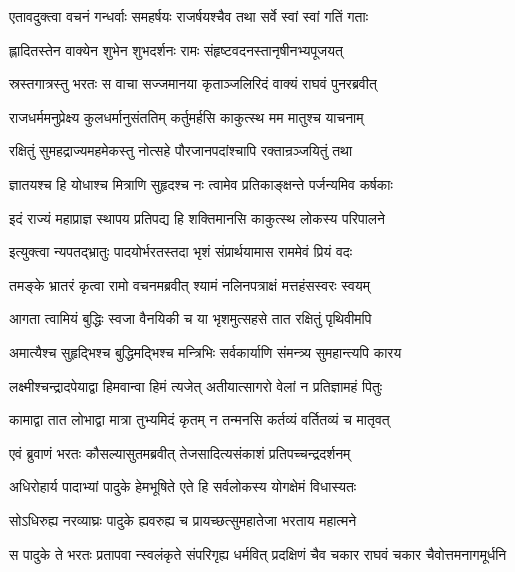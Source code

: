 \twolineshloka
{एतावदुक्त्वा वचनं गन्धर्वाः समहर्षयः}
{राजर्षयश्चैव तथा सर्वे स्वां स्वां गतिं गताः} %

\twolineshloka
{ह्लादितस्तेन वाक्येन शुभेन शुभदर्शनः}
{रामः संहृष्टवदनस्तानृषीनभ्यपूजयत्} %

\twolineshloka
{स्रस्तगात्रस्तु भरतः स वाचा सज्जमानया}
{कृताञ्जलिरिदं वाक्यं राघवं पुनरब्रवीत्} %

\twolineshloka
{राजधर्ममनुप्रेक्ष्य कुलधर्मानुसंततिम्}
{कर्तुमर्हसि काकुत्स्थ मम मातुश्च याचनाम्} %

\twolineshloka
{रक्षितुं सुमहद्राज्यमहमेकस्तु नोत्सहे}
{पौरजानपदांश्चापि रक्तान्रञ्जयितुं तथा} %

\twolineshloka
{ज्ञातयश्च हि योधाश्च मित्राणि सुहृदश्च नः}
{त्वामेव प्रतिकाङ्क्षन्ते पर्जन्यमिव कर्षकाः} %

\twolineshloka
{इदं राज्यं महाप्राज्ञ स्थापय प्रतिपद्य हि}
{शक्तिमानसि काकुत्स्थ लोकस्य परिपालने} %

\twolineshloka
{इत्युक्त्वा न्यपतद्भ्रातुः पादयोर्भरतस्तदा}
{भृशं संप्रार्थयामास राममेवं प्रियं वदः} %

\twolineshloka
{तमङ्के भ्रातरं कृत्वा रामो वचनमब्रवीत्}
{श्यामं नलिनपत्राक्षं मत्तहंसस्वरः स्वयम्} %

\twolineshloka
{आगता त्वामियं बुद्धिः स्वजा वैनयिकी च या}
{भृशमुत्सहसे तात रक्षितुं पृथिवीमपि} %

\twolineshloka
{अमात्यैश्च सुहृद्भिश्च बुद्धिमद्भिश्च मन्त्रिभिः}
{सर्वकार्याणि संमन्त्र्य सुमहान्त्यपि कारय} %

\twolineshloka
{लक्ष्मीश्चन्द्रादपेयाद्वा हिमवान्वा हिमं त्यजेत्}
{अतीयात्सागरो वेलां न प्रतिज्ञामहं पितुः} %

\twolineshloka
{कामाद्वा तात लोभाद्वा मात्रा तुभ्यमिदं कृतम्}
{न तन्मनसि कर्तव्यं वर्तितव्यं च मातृवत्} %

\twolineshloka
{एवं ब्रुवाणं भरतः कौसल्यासुतमब्रवीत्}
{तेजसादित्यसंकाशं प्रतिपच्चन्द्रदर्शनम्} %

\twolineshloka
{अधिरोहार्य पादाभ्यां पादुके हेमभूषिते}
{एते हि सर्वलोकस्य योगक्षेमं विधास्यतः} %

\twolineshloka
{सोऽधिरुह्य नरव्याघ्रः पादुके ह्यवरुह्य च}
{प्रायच्छत्सुमहातेजा भरताय महात्मने} %

\fourlineindentedshloka
{स पादुके ते भरतः प्रतापवा}
{न्स्वलंकृते संपरिगृह्य धर्मवित्}
{प्रदक्षिणं चैव चकार राघवं}
{ चकार चैवोत्तमनागमूर्धनि} %

